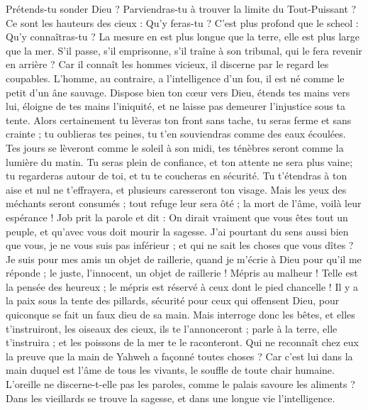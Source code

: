 \begin{multicols}{2}
Prétends-tu sonder Dieu ? Parviendras-tu à trouver la limite du Tout-Puissant ?
Ce sont les hauteurs des cieux : Qu'y feras-tu ? C'est plus profond que le scheol : Qu'y connaîtras-tu ?
La mesure en est plus longue que la terre, elle est plus large que la mer.
S'il passe, s'il emprisonne, s'il traîne à son tribunal, qui le fera revenir en arrière ?
Car il connaît les hommes vicieux, il discerne par le regard les coupables.
L'homme, au contraire, a l'intelligence d'un fou, il est né comme le petit d'un âne sauvage.
Dispose bien ton cœur vers Dieu, étends tes mains vers lui,
éloigne de tes mains l'iniquité, et ne laisse pas demeurer l'injustice sous ta tente.
Alors certainement tu lèveras ton front sans tache, tu seras ferme et sans crainte ;
tu oublieras tes peines, tu t'en souviendras comme des eaux écoulées.
Tes jours se lèveront comme le soleil à son midi, tes ténèbres seront comme la lumière du matin.
Tu seras plein de confiance, et ton attente ne sera plus vaine; tu regarderas autour de toi, et tu te coucheras en sécurité.
Tu t'étendras à ton aise et nul ne t'effrayera, et plusieurs caresseront ton visage.
Mais les yeux des méchants seront consumés ; tout refuge leur sera ôté ; la mort de l'âme, voilà leur espérance !
\VerseOne{}Job prit la parole et dit :
On dirait vraiment que vous êtes tout un peuple, et qu'avec vous doit mourir la sagesse.
J'ai pourtant du sens aussi bien que vous, je ne vous suis pas inférieur ; et qui ne sait les choses que vous dîtes ?
Je suis pour mes amis un objet de raillerie, quand je m'écrie à Dieu pour qu'il me réponde ; le juste, l'innocent, un objet de raillerie !
Mépris au malheur ! Telle est la pensée des heureux ; le mépris est réservé à ceux dont le pied chancelle !
Il y a la paix sous la tente des pillards, sécurité pour ceux qui offensent Dieu, pour quiconque se fait un faux dieu de sa main.
Mais interroge donc les bêtes, et elles t'instruiront, les oiseaux des cieux, ils te l'annonceront ;
parle à la terre, elle t'instruira ; et les poissons de la mer te le raconteront.
Qui ne reconnaît chez eux la preuve que la main de Yahweh a façonné toutes choses ?
Car c’est lui dans  la main duquel est l'âme de tous les vivants, le souffle de toute chair humaine.
L'oreille ne discerne-t-elle pas les paroles, comme le palais savoure les aliments ?
Dans les vieillards se trouve la sagesse, et dans une longue vie l'intelligence.

\end{multicols}
